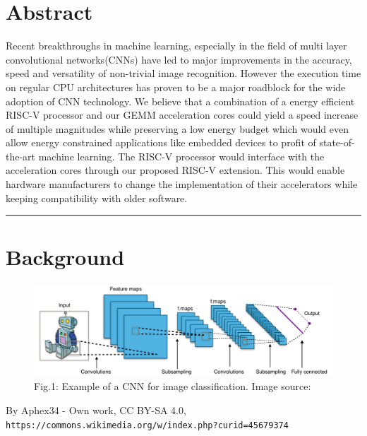 \twocolumn


\section{Abstract}
Recent breakthroughs in machine learning, especially in the field of multi layer convolutional networks(CNNs) have
led to major improvements in the accuracy, speed and versatility of non-trivial image recognition. However the
execution time on regular CPU architectures has proven to be a major roadblock for the wide adoption of CNN technology. 
We believe that a combination of a energy efficient RISC-V processor and our GEMM
acceleration cores could yield a speed increase of multiple magnitudes while preserving a low energy budget which 
would even allow energy constrained applications like embedded devices to profit of state-of-the-art machine
learning. The RISC-V processor would interface with the acceleration cores through our proposed RISC-V extension.
This would enable hardware manufacturers to change the implementation of their accelerators while keeping compatibility
with older software.

\vspace{0.5cm}
\hrule

\section{Background}

\begin{figure}[b]
    \centering
    \includegraphics[width=\textwidth]{Typical_cnn.png}
    \caption{Fig.1: Example of a CNN for image classification. Image source: \cite{CNN_example}}
\end{figure}
\onecolumn



\begin{thebibliography}{99}
\raggedright

By Aphex34 - Own work, CC BY-SA 4.0, \texttt{https://commons.wikimedia.org/w/index.php?curid=45679374}

\end{thebibliography}